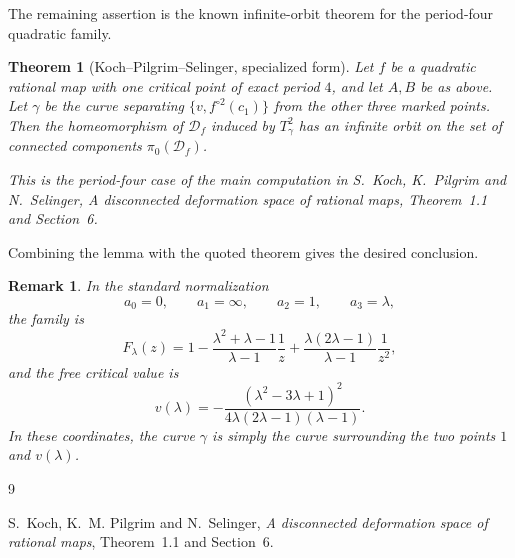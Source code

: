 \documentclass[11pt]{article}
\newcommand{\D}{\mathcal D}
\newtheorem{theorem}{Theorem}
\newtheorem{remark}{Remark}
\begin{document}
The remaining assertion is the known infinite-orbit theorem for the period-four quadratic family.

\begin{theorem}[Koch--Pilgrim--Selinger, specialized form]
Let \(f\) be a quadratic rational map with one critical point of exact period \(4\), and let \(A,B\) be as above. Let \(\gamma\) be the curve separating \(\{v,f^{\circ 2}(c_1)\}\) from the other three marked points. Then the homeomorphism of \(\D_f\) induced by \(T_\gamma^2\) has an infinite orbit on the set of connected components \(\pi_0(\D_f)\).

This is the period-four case of the main computation in S.~Koch, K.~Pilgrim and N.~Selinger, \emph{A disconnected deformation space of rational maps}, Theorem~1.1 and Section~6.
\end{theorem}

Combining the lemma with the quoted theorem gives the desired conclusion.

\begin{remark}
In the standard normalization
\[
a_0=0,\qquad a_1=\infty,\qquad a_2=1,\qquad a_3=\lambda,
\]
the family is
\[
F_\lambda(z)
=
1-\frac{\lambda^2+\lambda-1}{\lambda-1}\frac1z
+\frac{\lambda(2\lambda-1)}{\lambda-1}\frac1{z^2},
\]
and the free critical value is
\[
v(\lambda)
=
-\frac{(\lambda^2-3\lambda+1)^2}
{4\lambda(2\lambda-1)(\lambda-1)}.
\]
In these coordinates, the curve \(\gamma\) is simply the curve surrounding the two points \(1\) and \(v(\lambda)\).
\end{remark}

\begin{thebibliography}{9}

S.~Koch, K.~M. Pilgrim and N.~Selinger,
\emph{A disconnected deformation space of rational maps},
Theorem~1.1 and Section~6.

\end{thebibliography}
\end{document}
